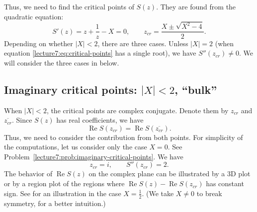 \documentclass[letterpaper,11pt,oneside,reqno]{book}
\numberwithin{equation}{chapter}  %
\theoremstyle{definition}
\begin{document}
Thus, we need to find the critical points of $S(z)$.
They are found from the quadratic equation:
\begin{equation}
	\label{lecture7:eq:critical-points}
	S'(z)=z+\frac{1}{z}-X=0,\qquad
	z_{cr}=\frac{X\pm \sqrt{X^2-4}}{2}.
\end{equation}
Depending on whether $|X|<2$, there are three cases.
Unless $|X|=2$ (when equation \eqref{lecture7:eq:critical-points} has a single root), we have
$S''(z_{cr})\ne 0$.
We will consider the three cases in
below.

\subsection{Imaginary critical points: $|X|<2$, ``bulk''}
\label{lecture7:sub:imaginary-critical-points}

When $|X|<2$, the critical points are complex conjugate.
Denote them by $z_{cr}$ and $\overline{z_{cr}}$.
Since $S(z)$ has real coefficients, we have
\begin{equation*}
	\operatorname{Re}S(z_{cr})=\operatorname{Re}S(\overline{z_{cr}}).
\end{equation*}
Thus, we need to consider the contribution from both points.
For simplicity of the computations, let us consider only the case $X=0$.
See Problem~\ref{lecture7:prob:imaginary-critical-points}.
We have
\begin{equation*}
	z_{cr}=i,\qquad
	S''(z_{cr})=2.
\end{equation*}
The behavior of $\operatorname{Re}S(z)$ on the complex plane
can be illustrated by a 3D plot or by a region plot of the regions
where $\operatorname{Re}S(z)-\operatorname{Re}S(z_{cr})$ has constant sign.
See  for an illustration in the case $X=\frac{1}{2}$.
(We take $X\ne 0$ to break symmetry, for a better intuition.)
\end{document}
